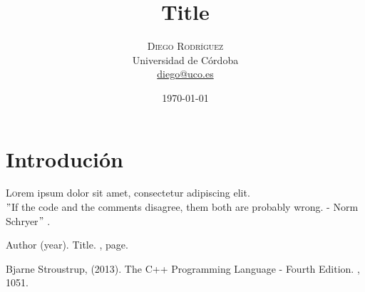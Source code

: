 \documentclass[twoside,twocolumn]{article}
\title{Title} %
\author{
    \textsc{Diego Rodríguez} \\
    \normalsize Universidad de Córdoba \\
    \normalsize \href{mailto:diego@uco.es}{diego@uco.es}
}
\date{\today}
\begin{document}
\maketitle
\pagebreak



\section{Introdución}

\lettrine[nindent=0em,lines=3]{L} orem ipsum dolor sit amet, consectetur adipiscing elit.
\blindtext %
\\$"$If the code and the comments disagree, them both are probably wrong. - Norm Schryer$"$ \cite{bjarne:cpp}.



\begin{thebibliography}{99}


Author (year).
\newblock Title.
, page.


Bjarne Stroustrup, (2013).
\newblock The C++ Programming Language - Fourth Edition.
, 1051.


\end{thebibliography}

\end{document}
